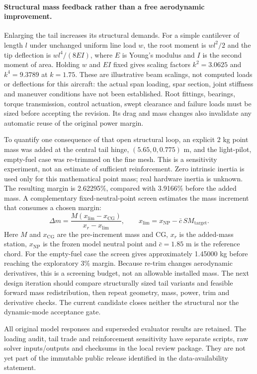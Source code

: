 \paragraph{Structural mass feedback rather than a free aerodynamic improvement.}
Enlarging the tail increases its structural demands. For a simple cantilever
of length $l$ under unchanged uniform line load $w$, the root moment is
$wl^2/2$ and the tip deflection is $wl^4/(8EI)$, where $E$ is Young's modulus
and $I$ is the second moment of area. Holding $w$ and $EI$ fixed gives scaling
factors $k^2=3.0625$ and $k^4=9.3789$ at $k=1.75$. These are illustrative
beam scalings, not computed loads or deflections for this aircraft: the actual
span loading, spar section, joint stiffness and maneuver conditions have not
been established. Root fittings, bearings, torque transmission, control
actuation, swept clearance and failure loads must be sized before accepting
the revision. Its drag and mass changes also invalidate any automatic reuse
of the original power margin.

To quantify one consequence of that open structural loop, an explicit
2 kg point mass was added at the central tail hinge, $(5.65,0,0.775)$ m,
and the light-pilot, empty-fuel case was re-trimmed on the fine mesh. This is
a sensitivity experiment, not an estimate of sufficient reinforcement.
Zero intrinsic inertia is used only for this mathematical point mass; real
hardware inertia is unknown. The resulting margin is 2.62295\%, compared
with 3.9166\% before the added mass. A complementary fixed-neutral-point
screen estimates the mass increment that consumes a chosen margin:
\begin{equation}
 \Delta m = \frac{M(x_{\mathrm{lim}}-x_{\mathrm{CG}})}
 {x_r-x_{\mathrm{lim}}},\qquad
 x_{\mathrm{lim}}=x_{\mathrm{NP}}-\bar c\,SM_{\mathrm{target}}.
\label{eq:tail-mass-budget}
\end{equation}
Here $M$ and $x_{\mathrm{CG}}$ are the pre-increment mass and CG, $x_r$ is the
added-mass station, $x_{\mathrm{NP}}$ is the frozen model neutral point and
$\bar c=1.85$ m is the reference chord. For the empty-fuel case the screen
gives approximately 1.45000 kg before reaching the exploratory 3\% margin.
Because re-trim changes aerodynamic derivatives, this is a screening budget,
not an allowable installed mass. The next design iteration should compare
structurally sized tail variants and feasible forward mass redistribution,
then repeat geometry, mass, power, trim and derivative checks. The current
candidate closes neither the structural nor the dynamic-mode acceptance gate.

All original model responses and superseded evaluator results are retained.
The loading audit, tail trade and reinforcement sensitivity have separate
scripts, raw solver inputs/outputs and checksums in the local review package.
They are not yet part of the immutable public release identified in the
data-availability statement.

